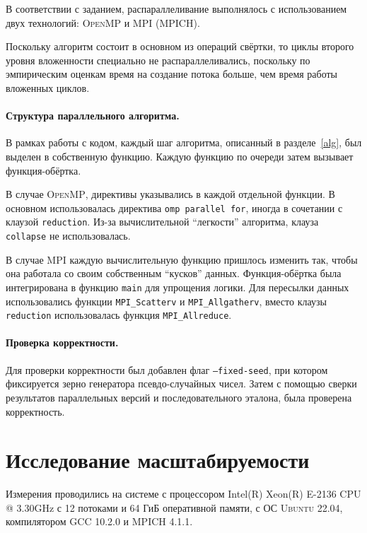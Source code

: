 \documentclass{scrartcl}
\begin{document}
В соответствии с заданием, распараллеливание выполнялось с использованием двух технологий: \textsc{OpenMP} и \textsc{MPI (MPICH)}.

Поскольку алгоритм состоит в основном из операций свёртки, то циклы второго уровня вложенности специально не распараллеливались, поскольку по эмпирическим оценкам время на создание потока больше, чем время работы вложенных циклов.

\paragraph{Структура параллельного алгоритма.}
В рамках работы с кодом, каждый шаг алгоритма, описанный в разделе~\ref{alg}, был выделен в собственную функцию.
Каждую функцию по очереди затем вызывает функция-обёртка.

В случае \textsc{OpenMP}, директивы указывались в каждой отдельной функции.
В основном использовалась директива \texttt{omp parallel for}, иногда в сочетании с клаузой \texttt{reduction}.
Из-за вычислительной \enquote{легкости} алгоритма, клауза \texttt{collapse} не использовалась.

В случае \textsc{MPI} каждую вычислительную функцию пришлось изменить так, чтобы она работала со своим собственным \enquote{кусков} данных.
Функция-обёртка была интегрирована в функцию \texttt{main} для упрощения логики.
Для пересылки данных использовались функции \texttt{MPI\_Scatterv} и \texttt{MPI\_Allgatherv}, вместо клаузы \texttt{reduction} использовалась функция \texttt{MPI\_Allreduce}.

\paragraph{Проверка корректности.}
Для проверки корректности был добавлен флаг \texttt{--fixed-seed}, при котором фиксируется зерно генератора псевдо-случайных чисел.
Затем с помощью сверки результатов параллельных версий и последовательного эталона, была проверена корректность.

\section{Исследование масштабируемости}


Измерения проводились на системе с процессором Intel(R) Xeon(R) E-2136 CPU @ 3.30GHz с 12 потоками и 64 ГиБ оперативной памяти, с ОС \textsc{Ubuntu 22.04}, компилятором \textsc{GCC 10.2.0} и \textsc{MPICH 4.1.1}.
\end{document}
